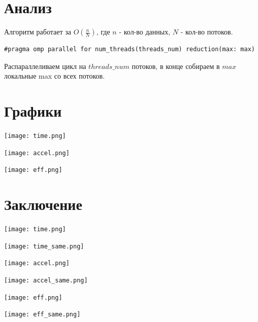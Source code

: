 \documentclass{article}
\begin{document}
\newpage
\section{Анализ}
Алгоритм работает за $O\left(\frac{n}{N}\right)$, где $n$ - кол-во данных, $N$ - кол-во потоков.
\begin{verbatim}
#pragma omp parallel for num_threads(threads_num) reduction(max: max)
\end{verbatim}
Распараллеливаем цикл на $threads\_num$ потоков, в конце собираем в $max$
локальные max со всех потоков.

\newpage
\section{Графики}
\begin{minipage}{\linewidth}
    \texttt{[image: time.png]}
\end{minipage}
\begin{minipage}{0.48\linewidth}
    \texttt{[image: accel.png]}
\end{minipage}
\hfill
\begin{minipage}{0.49\linewidth}
    \texttt{[image: eff.png]}
\end{minipage}

\newpage
\section{Заключение}
\begin{minipage}{0.48\linewidth}
    \texttt{[image: time.png]}
\end{minipage}
\hfill
\begin{minipage}{0.49\linewidth}
    \texttt{[image: time\_same.png]}
\end{minipage}

\begin{minipage}{0.48\linewidth}
    \texttt{[image: accel.png]}
\end{minipage}
\hfill
\begin{minipage}{0.49\linewidth}
    \texttt{[image: accel\_same.png]}
\end{minipage}
\begin{minipage}{0.48\linewidth}
    \texttt{[image: eff.png]}
\end{minipage}
\hfill
\begin{minipage}{0.49\linewidth}
    \texttt{[image: eff\_same.png]}
\end{minipage}
\end{document}
